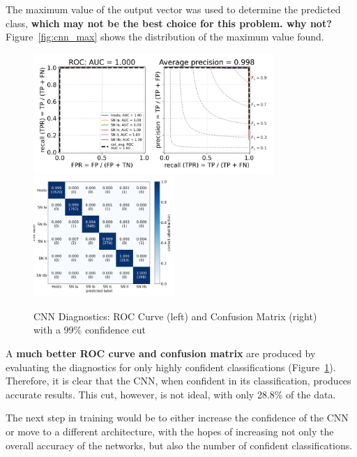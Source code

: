 The maximum value of the output vector was used to determine the predicted class,
\textbf{which may not be the best choice for this problem. why not?} Figure~\ref{fig:cnn_max} shows
the distribution of the maximum value found. 
\begin{figure}[t]
    \centering
    \includegraphics[height=4.55cm]{figures/cnn/cnn_roc99.png}
    \quad
    \includegraphics[height=4.55cm]{figures/cnn/cnn_cm99.png}
    \caption[CNN diagnostics with a confidence cut]{CNN Diagnostics: ROC Curve (left) and Confusion Matrix (right) with a 99\% confidence cut\label{fig:cnn_qual2}}
\end{figure}

A \textbf{much better ROC curve and confusion matrix }are produced by 
evaluating the diagnostics for only highly confident classifications (Figure~\ref{fig:cnn_qual2}). 
Therefore, it is clear that the CNN, when confident in its classification, produces 
accurate results. This cut, however, is not ideal, with only 28.8\% of the 
data. 

The next step in training would be to either increase the confidence of the CNN 
or move to a different architecture, with the hopes of increasing not only 
the overall accuracy of the networks, but also the number of confident classifications.

